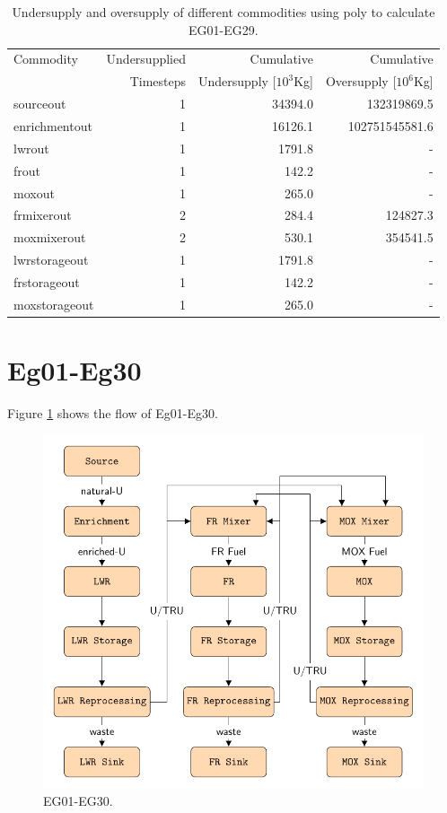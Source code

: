 \documentclass[11pt]{article}
\begin{document}
\begin{table}[!h]
	\centering
	\caption{Undersupply and oversupply of different commodities using poly to calculate EG01-EG29.}
	\label{tab:29-commod}
	\begin{tabularx}{\textwidth}{lRRR}
		\hline
		Commodity & Undersupplied & Cumulative  & Cumulative \\
		& Timesteps & Undersupply [$10^3$Kg]  & Oversupply [$10^6$Kg] \\ \hline
		sourceout & 1 & 34394.0  & 132319869.5 \\ 
		enrichmentout & 1 & 16126.1 & 102751545581.6 \\

		lwrout & 1 & 1791.8 & - \\
		frout & 1 & 142.2 & - \\
		moxout & 1 & 265.0 & - \\

		frmixerout & 2 & 284.4 & 124827.3 \\
        moxmixerout & 2 & 530.1 & 354541.5 \\

		lwrstorageout & 1 & 1791.8 & - \\
		frstorageout & 1 & 142.2 & - \\
		moxstorageout & 1 & 265.0 & - \\ \hline
	\end{tabularx}
\end{table}

\section{Eg01-Eg30}

Figure \ref{fig:30flow} shows the flow of Eg01-Eg30.

\begin{figure}[!h]
	\centering
	\includegraphics[width=\textwidth]{30-figures/30flow.pdf} 
	\hfill
	\caption{EG01-EG30.}
	\label{fig:30flow}
\end{figure}
\end{document}
